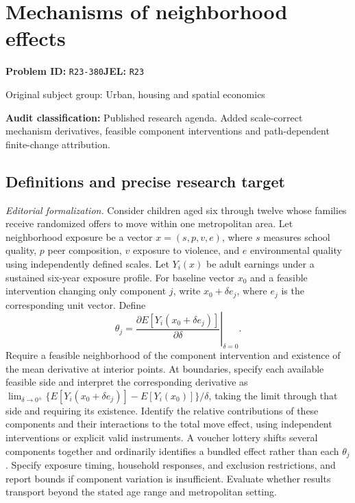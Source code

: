 \documentclass[11pt,a4paper]{article}
\begin{document}
\section*{Mechanisms of neighborhood effects}
\textbf{Problem ID:} \texttt{R23-380}\quad \textbf{JEL:} \texttt{R23}\par
\label{problem:OP-0466}
{\sffamily\small\color{muted}Original subject group: Urban, housing and spatial economics\par}
\label{definitions:problem:30007748}
\textbf{Audit classification:} Published research agenda. Added scale-correct mechanism derivatives, feasible component interventions and path-dependent finite-change attribution.
\subsection*{Definitions and precise research target}
\textit{Editorial formalization.} Consider children aged six through twelve whose families receive randomized offers to move within one metropolitan area. Let neighborhood exposure be a vector \(x=(s,p,v,e)\), where \(s\) measures school quality, \(p\) peer composition, \(v\) exposure to violence, and \(e\) environmental quality using independently defined scales. Let \(Y_i(x)\) be adult earnings under a sustained six-year exposure profile. For baseline vector \(x_0\) and a feasible intervention changing only component \(j\), write \(x_0+\delta e_j\), where \(e_j\) is the corresponding unit vector. Define
\[\theta_j=\left.\frac{\partial E[Y_i(x_0+\delta e_j)]}{\partial\delta}\right|_{\delta=0}.\]
Require a feasible neighborhood of the component intervention and existence of the mean derivative at interior points. At boundaries, specify each available feasible side and interpret the corresponding derivative as \(\lim_{\delta\to0^\pm}\{E[Y_i(x_0+\delta e_j)]-E[Y_i(x_0)]\}/\delta\), taking the limit through that side and requiring its existence. Identify the relative contributions of these components and their interactions to the total move effect, using independent interventions or explicit valid instruments. A voucher lottery shifts several components together and ordinarily identifies a bundled effect rather than each \(\theta_j\). Specify exposure timing, household responses, and exclusion restrictions, and report bounds if component variation is insufficient. Evaluate whether results transport beyond the stated age range and metropolitan setting.
\end{document}
